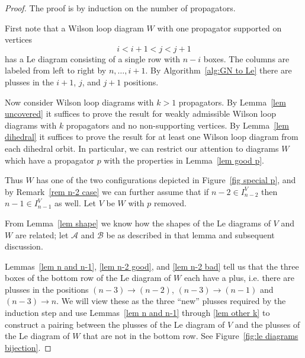 \documentclass[11pt]{article}
\newcommand{\sanote}{\todo[color=violet!30]}
\theoremstyle{remark}
\theoremstyle{definition}
\begin{document}
\begin{proof}
  The proof is by induction on the number of propagators.

  First note that a Wilson loop diagram $W$ with one propagator supported on vertices \[{i<i+1<j<j+1}\] has a Le diagram consisting of a single row with $n-i$ boxes. The columns are labeled from left to right by $n, \ldots, i+1$. By Algorithm~\ref{alg:GN to Le} there are plusses in the $i+1$, $j$, and $j+1$ positions. 

  Now consider Wilson loop diagrams with $k>1$ propagators.  By Lemma~\ref{lem uncovered} it suffices to prove the result for weakly admissible Wilson loop diagrams with $k$ propagators and no non-supporting vertices.  By Lemma~\ref{lem dihedral} it suffices to prove the result for at least one Wilson loop diagram from each dihedral orbit. In particular, we can restrict our attention to diagrams $W$ which have a propagator $p$ with the properties in Lemma~\ref{lem good p}.  


Thus $W$ has one of the two configurations depicted in Figure~\ref{fig special p}, and by Remark~\ref{rem n-2 case} we can further assume that if $n-2 \in I_{n-2}^V$ then $n-1 \in I_{n-1}^V$ as well. Let $V$ be $W$ with $p$ removed. 

  From Lemma~\ref{lem shape} we know how the shapes of the Le diagrams of $V$ and $W$ are related; let $\mathcal{A}$ and $\mathcal{B}$ be as described in that lemma and subsequent discussion.  

  Lemmas~\ref{lem n and n-1}, \ref{lem n-2 good}, and \ref{lem n-2 bad} tell us that the three boxes of the bottom row of the Le diagram of $W$ each have a plus, i.e. there are plusses in the positions $(n-3) \rightarrow (n-2)$, $(n-3) \rightarrow (n-1)$ and $(n-3) \rightarrow n$. We will view these as the three ``new'' plusses required by the induction step and use Lemmas~\ref{lem n and n-1} through \ref{lem other k} to construct a pairing between the plusses of the Le diagram of $V$ and the plusses of the Le diagram of $W$ that are not in the bottom row. See Figure~\ref{fig:le diagrams bijection}.


\end{proof}
\end{document}

